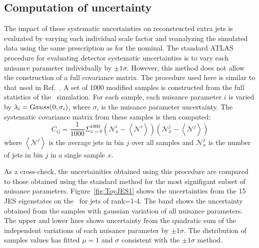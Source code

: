 \subsection{Computation of uncertainty}
\label{ss:systoy}
The impact of these systematic uncertainties on reconstructed extra jets is evaluated by varying each individual scale factor and reanalyzing the simulated data using the same prescription as for the nominal. The standard ATLAS procedure for evaluating detector systematic uncertainties is to vary each nuisance parameter individually by $\pm 1\sigma$. However, this method does not allow the construction of a full covariance matrix. The procedure used here is similar to that used in Ref.~\cite{Bell:1470588}. A set of 1000 modified samples is constructed from the full statistics of the \powpy\ simulation. For each sample, each nuisance parameter $i$ is varied by $\lambda_i ={\textrm Gauss}(0, \sigma_i)$, where $\sigma_i$ is the nuisance parameter uncertainty. The systematic covariance matrix from these samples is then computed:
\begin{equation}
C_{ij}=\frac{1}{1000} \Sigma_{x=0}^{1000} \left({\mathscr N}_x^i- \left \langle{\mathscr N}^i \right \rangle \right) \left({\mathscr N}_x^j- \left \langle{\mathscr N}^j \right \rangle \right)
\label{eqn:cov}
\end{equation}
where $\left \langle{\mathscr N}^j \right \rangle$ is the average jets in bin $j$ over all samples and ${\mathscr N}_x^j$ is the number of jets in bin $j$ in a single sample $x$. 

As a cross-check, the uncertainities obtained using this procedure are compared to those obtained using the standard method for the most signifigant subset of nuisance parameters. Figure~\ref{fig:ToyJES1} shows the uncertainties from the 15 JES eigenstates on the \pt\ for jets of rank=1-4. The band shows the uncertainty obtained from the samples with gaussian variation of all nuisance parameters. The upper and lower lines shows uncertainty from the quadratic sum of the independent variations of each nuisance parameter by $\pm 1 \sigma$. The distribution of samples values has fitted $\mu=1$ and $\sigma$ consistent with the $\pm 1 \sigma$ method.





